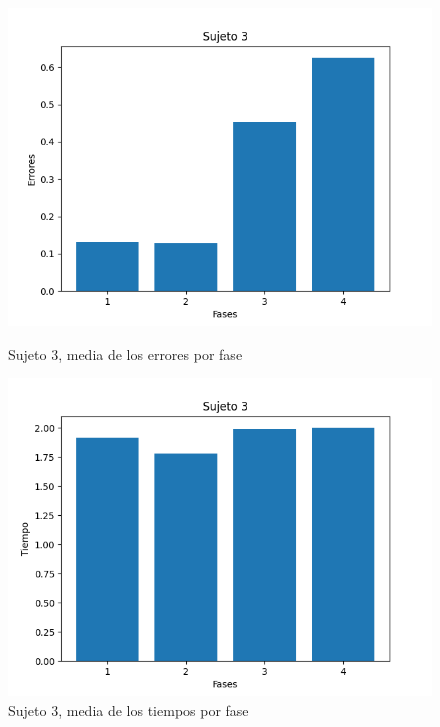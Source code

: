 \documentclass[a4paper,11pt, oneside]{book}
\begin{document}
\begin{figure}[H]
	\begin{minipage}[b]{0.5\linewidth}
		\centering
		\includegraphics[width=\linewidth]{sujeto3-errores}
		\caption{Sujeto 3, media de los errores por fase}
		\label{sujeto3-errores}
	\end{minipage}
	\hspace{0.5cm}
	\begin{minipage}[b]{0.5\linewidth}
		\centering
		\includegraphics[width=\linewidth]{sujeto3-time}
		\caption{Sujeto 3, media de los tiempos por fase}
		\label{sujeto3-time}
	\end{minipage}
\end{figure}
\end{document}
